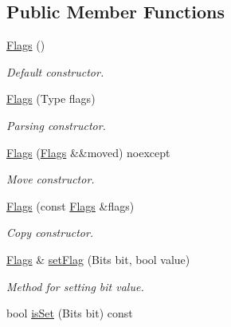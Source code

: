 \subsection*{Public Member Functions}
\begin{DoxyCompactItemize}
\item 
\mbox{\label{classDiameter_1_1Packet_1_1Header_1_1Flags_a002ec68b1b99976de9484b2a113103d1}} 
\hyperlink{classDiameter_1_1Packet_1_1Header_1_1Flags_a002ec68b1b99976de9484b2a113103d1}{Flags} ()
\begin{DoxyCompactList}\small\item\em Default constructor. \end{DoxyCompactList}\item 
\hyperlink{classDiameter_1_1Packet_1_1Header_1_1Flags_a76ab5597a6d9a396bb810f8ac8ebbfce}{Flags} (Type flags)
\begin{DoxyCompactList}\small\item\em Parsing constructor. \end{DoxyCompactList}\item 
\hyperlink{classDiameter_1_1Packet_1_1Header_1_1Flags_aa6ebefbb36f446bd2ec91150a1a95319}{Flags} (\hyperlink{classDiameter_1_1Packet_1_1Header_1_1Flags}{Flags} \&\&moved) noexcept
\begin{DoxyCompactList}\small\item\em Move constructor. \end{DoxyCompactList}\item 
\hyperlink{classDiameter_1_1Packet_1_1Header_1_1Flags_ac423d9923ebcafc66cd624e49b1cc674}{Flags} (const \hyperlink{classDiameter_1_1Packet_1_1Header_1_1Flags}{Flags} \&flags)
\begin{DoxyCompactList}\small\item\em Copy constructor. \end{DoxyCompactList}\item 
\hyperlink{classDiameter_1_1Packet_1_1Header_1_1Flags}{Flags} \& \hyperlink{classDiameter_1_1Packet_1_1Header_1_1Flags_af50380856a40d98f7c82bc55fa4b61a6}{set\+Flag} (Bits bit, bool value)
\begin{DoxyCompactList}\small\item\em Method for setting bit value. \end{DoxyCompactList}\item 
bool \hyperlink{classDiameter_1_1Packet_1_1Header_1_1Flags_ab473570b7a14705c03786b816443e937}{is\+Set} (Bits bit) const

\end{DoxyCompactItemize}
